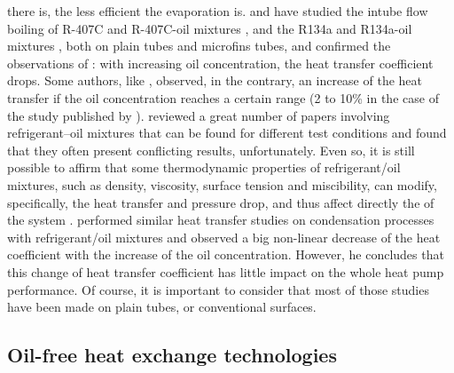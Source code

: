there is, the less efficient the evaporation is.
\citet{Nidegger-Thome-1997a} and \citet{Zurcher-Favrat-1998a} have
studied the intube flow boiling of R-407C and R-407C-oil mixtures
\citep{Zurcher-Favrat-1998a,Zurcher-Favrat-1998b}, and the R134a and
R134a-oil mixtures \citep{Zurcher-Favrat-1997a,Nidegger-Thome-1997a},
both on plain tubes and microfins tubes, and confirmed the
observations of \citet{McMullan-Morgan-1983a}: with increasing oil
concentration, the heat transfer coefficient drops. Some authors, like
\citet{Cawte-Poland-1996a}, observed, in the contrary, an increase of
the heat transfer if the oil concentration reaches a certain range (2
to 10\% in the case of the study published by
\citet{Cawte-Poland-1996a}). \citet{BandarraFilho-Thome-2009a}
reviewed a great number of papers involving refrigerant–oil mixtures
that can be found for different test conditions and found that they
often present conflicting results, unfortunately. Even so, it is still
possible to affirm that some thermodynamic properties of
refrigerant/oil mixtures, such as density, viscosity, surface tension
and miscibility, can modify, specifically, the heat transfer and
pressure drop, and thus affect directly the \COP{} of the system
\citep[p.\,186]{BandarraFilho-Thome-2009a}. \citet{Cawte-1992a}
performed similar heat transfer studies on condensation processes with
refrigerant/oil mixtures and observed a big non-linear decrease of the
heat coefficient with the increase of the oil concentration. However,
he concludes that this change of heat transfer coefficient has little
impact on the whole heat pump performance. Of course, it is important
to consider that most of those studies have been made on plain tubes,
or conventional surfaces.

\subsection{Oil-free heat exchange technologies}
\label{sec:sota-oilfree-hx}

